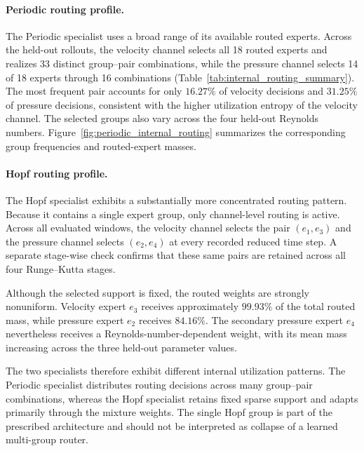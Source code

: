 \documentclass{article}
\begin{document}
\par

\paragraph{Periodic routing profile.}
The Periodic specialist uses a broad range of its available routed experts. Across the held-out rollouts, the velocity channel selects all 18 routed experts and realizes 33 distinct group--pair combinations, while the pressure channel selects 14 of 18 experts through 16 combinations (Table~\ref{tab:internal_routing_summary}). The most frequent pair accounts for only $16.27\%$ of velocity decisions and $31.25\%$ of pressure decisions, consistent with the higher utilization entropy of the velocity channel. The selected groups also vary across the four held-out Reynolds numbers.
Figure~\ref{fig:periodic_internal_routing} summarizes the corresponding group frequencies and routed-expert masses.



\paragraph{Hopf routing profile.}
The Hopf specialist exhibits a substantially more concentrated routing pattern. Because it contains a single expert group, only channel-level routing is active. Across all evaluated windows, the velocity channel selects the pair
$(e_1,e_3)$ and the pressure channel selects $(e_2,e_4)$ at every recorded reduced time step. A separate stage-wise check confirms that these same pairs are retained across all four Runge--Kutta stages.

Although the selected support is fixed, the routed weights are strongly nonuniform. Velocity expert $e_3$ receives approximately $99.93\%$ of the total routed mass, while pressure expert $e_2$ receives $84.16\%$. The secondary pressure expert $e_4$ nevertheless receives a Reynolds-number-dependent weight, with its mean mass increasing across the three held-out parameter values.

The two specialists therefore exhibit different internal utilization patterns. The Periodic specialist distributes routing decisions across many group--pair combinations, whereas the Hopf specialist retains fixed sparse support and adapts primarily through the mixture weights. The single Hopf group is part of the prescribed architecture and should not be interpreted as collapse of a learned multi-group router.
\end{document}
